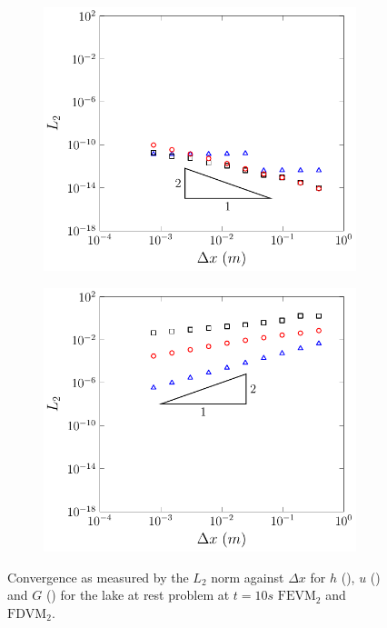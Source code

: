 \begin{figure}
\begin{subfigure}{0.5\textwidth}
		\vspace{0.3cm}
	\end{subfigure}
	\begin{subfigure}{0.5\textwidth}
		\includegraphics[width=\textwidth]{./chp5/figures/Analytic/LakeAtRest/L2/FDVMWB.pdf}
	\end{subfigure}%
	\begin{subfigure}{0.5\textwidth}
		\includegraphics[width=\textwidth]{./chp5/figures/Analytic/LakeAtRest/L2/FDVMnWB.pdf}
	\end{subfigure}
	\caption{Convergence as measured by the $L_2$ norm against $\Delta x$ for $h$ (), $u$ () and $G$ () for the lake at rest problem at $t=10s$ $\text{FEVM}_2$ and $\text{FDVM}_2$.}
	\label{fig:LakeAtRestEL1}
\end{figure}

